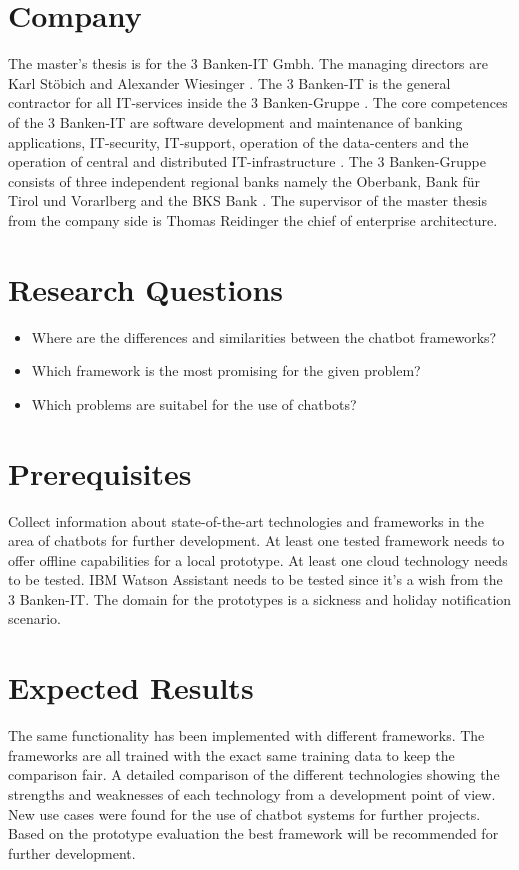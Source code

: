 \section{Company}
The master's thesis is for the 3 Banken-IT Gmbh. The managing directors are Karl St\"obich and Alexander Wiesinger \cite{3bitorgani}. 
The 3 Banken-IT is the general contractor for all IT-services inside the 3 Banken-Gruppe \cite{3bitservices}. 
The core competences of the 3 Banken-IT are software development and maintenance of banking applications, IT-security, 
IT-support, operation of the data-centers and the operation of central and distributed IT-infrastructure \cite{3bitservices}. 
The 3 Banken-Gruppe consists of three independent regional banks namely the Oberbank, Bank für Tirol und Vorarlberg and the BKS Bank \cite{3bitcompany}. 
The supervisor of the master thesis from the company side is Thomas Reidinger the chief of enterprise architecture.

\section{Research Questions}
\begin{itemize}
    \item Where are the differences and similarities between the chatbot frameworks?
    \item Which framework is the most promising for the given problem?
    \item Which problems are suitabel for the use of chatbots?
\end{itemize}

\section{Prerequisites} \label{sec:prereq}
Collect information about state-of-the-art technologies and frameworks in the area of chatbots for further development.
At least one tested framework needs to offer offline capabilities for a local prototype.
At least one cloud technology needs to be tested.
IBM Watson Assistant needs to be tested since it's a wish from the 3 Banken-IT.
The domain for the prototypes is a sickness and holiday notification scenario.


\section{Expected Results}
The same functionality has been implemented with different frameworks.
The frameworks are all trained with the exact same training data to keep the comparison fair.
A detailed comparison of the different technologies showing the strengths and weaknesses of each technology from a development point of view.
New use cases were found for the use of chatbot systems for further projects.
Based on the prototype evaluation the best framework will be recommended for further development.